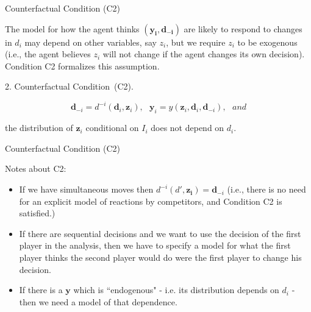\begin{frame}{Counterfactual Condition (C2)}

The model for how the agent thinks $(\mathbf{y_i, d_{-i}})$ are likely to
respond to changes in $d_i$ may depend on other variables, say $z_i$, but we require $z_i$ to be exogenous (i.e., the agent believes $z_i$ will not change if the agent changes its own
decision). Condition C2 formalizes this assumption.

\vspace{0.2in}

2. Counterfactual Condition\ (C2).

\begin{equation*}
\mathbf{d}_{-i}=d^{-i}(\mathbf{d}_{i},\mathbf{z}_{i}),\text{ \ }\mathbf{y}%
_{i}=y(\mathbf{z}_{i},\mathbf{d}_{i},\mathbf{d}_{-i}),\text{ }and
\end{equation*}

the distribution of $\mathbf{z}_{i}$ conditional on $\mathit{I}_{i}$ does
not depend on $d_{i}$.

\end{frame}

\begin{frame}{Counterfactual Condition (C2)}

Notes about C2:

\begin{itemize}


\item If we have simultaneous moves then $d^{-i}(d',\mathbf{z_i}) = \mathbf{d}_{-i}$ (i.e., there is no need for an explicit model of reactions by competitors, and Condition C2 is satisfied.)

\item If there are sequential decisions and we want to use the decision of the first player in the analysis,
then we have to specify a model for what the first player
thinks the second player would do were the first player to
change his decision.

\item If there is a $\mathbf{y}$ which is ``endogenous" - i.e. its distribution depends on $d_{i}$ - then we
need a model of that dependence.
\end{itemize}

\end{frame}

